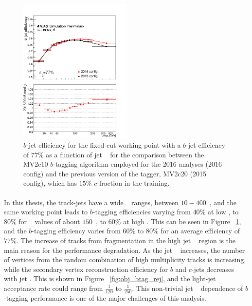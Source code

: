 \begin{figure}[htbp!]
  \centering
  \captionsetup{justification=centering}
  \includegraphics[width=0.5\textwidth]{figures/object/b_eff_pt}
   \caption{$b$-jet efficiency for the fixed cut working point with a $b$-jet efficiency of $77\%$ as a function of jet \pt~ for the comparison between the MV2c10 $b$-tagging algorithm employed for the 2016 analyses (2016 config) and the previous version of the tagger, MV2c20 (2015 config), which has $15\%$ $c$-fraction in the training.}
  \label{fig:obj_b_eff}
\end{figure}

\paragraph{}
In this thesis, the track-jets have a wide \pt~ ranges, between $10-400$~\GeV, and the same working point leads to $b$-tagging efficiencies varying from $40\%$ at low \pt, to $80\%$ for \pt~ values of about $150$~\GeV, to $60\%$ at high \pt. 
This can be seen in Figure ~\ref{fig:obj_b_eff}, and the $b$-tagging efficiency varies from $60\%$ to $80\%$ for an average efficiency of $77\%$.
The increase of tracks from fragmentation in the high jet \pt~ region is the main reason for the performance degradation. 
As the jet \pt~ increases, the number of vertices from the random combination of high multiplicity tracks is increasing, while the secondary vertex reconstruction efficiency for $b$ and $c$-jets decreases with jet \pt.
This is shown in Figure ~\ref{fig:obj_btag_rej}, and the light-jet acceptance rate could range from $\frac{1}{120}$ to $\frac{1}{250}$.
This non-trivial jet \pt~ dependence of $b$-tagging performance is one of the major challenges of this analysis.


